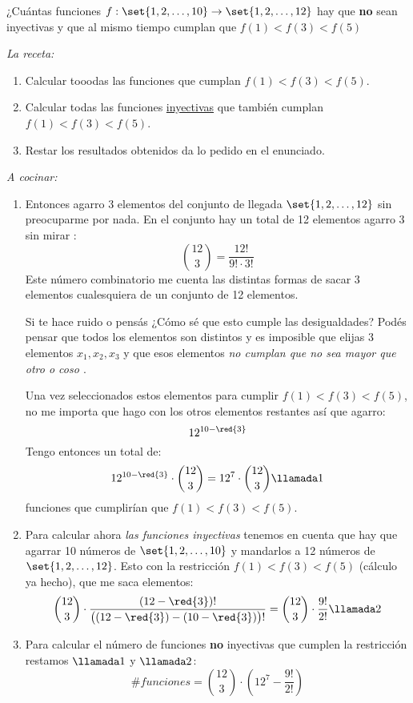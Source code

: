 \begin{enunciado}{\ejExtra}
  ¿Cuántas funciones $f: \set{1,2,\dots,10}\to \set{1,2,\dots,12}$ hay que \textbf{no} sean inyectivas y que
  al mismo tiempo cumplan que $f(1) < f(3) < f(5)$
\end{enunciado}

\textit{La receta:}
\begin{enumerate}[label=\arabic*)]
  \item Calcular tooodas las funciones que cumplan $f(1) < f(3) < f(5)$.
  \item Calcular todas las funciones \underline{inyectivas} que también cumplan $f(1) < f(3) < f(5)$.
  \item Restar los resultados obtenidos da lo pedido en el enunciado.
\end{enumerate}

\textit{A cocinar:}

\begin{enumerate}[label=\arabic*)]
  \item
        Entonces agarro 3 elementos del conjunto de llegada $\set{1,2,\dots,12}$ sin preocuparme por nada. En el conjunto
        hay un total de 12 elementos agarro 3 sin mirar :
        $$
          \binom{12}{3} = \frac{12!}{9! \cdot 3!}
        $$
        Este número combinatorio me cuenta las distintas formas de sacar 3 elementos cualesquiera de un conjunto de 12 elementos.

        Si te hace ruido o pensás ¿Cómo sé que esto cumple las desigualdades? Podés pensar que todos los elementos son distintos y es imposible que elijas
        3 elementos $x_1, x_2, x_3$ y que esos elementos \textit{no cumplan que no sea mayor que otro o coso \href{\mindExplosion}{}}.

        Una vez seleccionados estos  elementos para cumplir $f(1) < f(3) < f(5)$, no me importa que hago con los otros elementos restantes
        así que agarro:
        $$
          12^{10-\red{3}}
        $$
        Tengo entonces un total de:
        $$
          12^{10-\red{3}} \cdot \binom{12}{3} = 12^7 \cdot \binom{12}{3} \llamada1
        $$
        funciones que cumplirían que $f(1) < f(3) < f(5)$.

  \item
          Para calcular ahora  \textit{las funciones inyectivas} tenemos en cuenta que hay que agarrar 10 números de $\set{1,2,\dots,10}$ y mandarlos a 12 números
                de $\set{1,2,\dots,12}$. Esto con la restricción $f(1) < f(3) < f(5)$ (cálculo ya hecho), que me saca  elementos:
        $$
          \binom{12}{3} \cdot \frac{(12 - \red{3})!}{\big((12 - \red{3}) - (10 - \red{3})\big)!}
                =
                \binom{12}{3} \cdot \frac{9!}{2!}\llamada2
        $$

  \item
        Para calcular el número de funciones \textbf{no} inyectivas que cumplen la restricción restamos $\llamada1$ y $\llamada2$:
        $$
          \#funciones = \binom{12}{3} \cdot (12^7 - \frac{9!}{2!})
        $$
\end{enumerate}

\begin{aportes}
  \item {}
  \item {}
\end{aportes}
